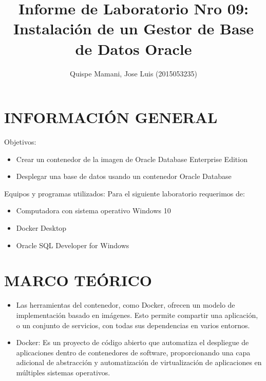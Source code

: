 \documentclass[preprint,12pt]{elsarticle}
\begin{document}
	\begin{frontmatter}
		\title{\huge Informe de Laboratorio Nro 09: Instalación de un Gestor de Base de Datos Oracle}
		\address{Universidad Privada de Tacna}
		\address{Escuela Profesional de Ingeniería de Sistemas}
		\address{Curso : Base de Datos II}		
		\author{Quispe Mamani, Jose Luis      	(2015053235)}		
		\address{Tacna, Perú}
\end{frontmatter}

\section{INFORMACIÓN GENERAL}
Objetivos:
\begin{itemize}
\item Crear un contenedor de la imagen de Oracle Database Enterprise Edition 
\item Desplegar una base de datos usando un contenedor Oracle Database
\end{itemize}
Equipos y programas utilizados:
Para el siguiente laboratorio requerimos de:
\begin{itemize}
\item Computadora con sistema operativo Windows 10
\item Docker Desktop
\item Oracle SQL Developer for Windows

\end{itemize}

\section{MARCO TEÓRICO}
\begin{itemize}
\item Las herramientas del contenedor, como Docker, ofrecen un modelo de implementación basado en imágenes. Esto permite compartir una aplicación, o un conjunto de servicios, con todas sus dependencias en varios entornos.
\item Docker: Es un proyecto de código abierto que automatiza el despliegue de aplicaciones dentro de contenedores de software, proporcionando una capa adicional de abstracción y automatización de virtualización de aplicaciones en múltiples sistemas operativos.
\end{itemize}
\end{document}
